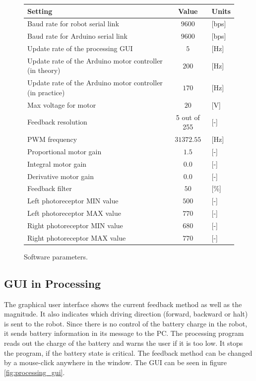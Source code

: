 	\begin{figure}[h!]
		\centering
		\begin{tabular}{|l|c|l|}
			
			\hline
			Setting & Value & Units \\ \hline \hline
			Baud rate for robot serial link & $9600$ & [bps]\\ \hline
			Baud rate for Arduino serial link & $9600$ & [bps] \\ \hline
			Update rate of the processing GUI & $5$ & [Hz] \\ \hline
			Update rate of the Arduino motor controller (in theory) & $200$ & [Hz] \\ \hline
			Update rate of the Arduino motor controller (in practice) & $170$ & [Hz] \\ \hline %
			Max voltage for motor & $20$ & [V] \\ \hline
			Feedback resolution & 5 out of 255 & [-] \\ \hline
			PWM frequency & $31372.55$ & [Hz]  \\ \hline
			Proportional motor gain & $1.5$  & [-] \\ \hline
			Integral motor gain & $0.0$  & [-]\\ \hline
			Derivative motor gain & $0.0$  & [-]\\ \hline
			Feedback filter  & $50$ & [\%] \\ \hline %
			Left photoreceptor MIN value & $500$ & [-] \\ \hline %
			Left photoreceptor MAX value & $770$ & [-] \\ \hline
			Right photoreceptor MIN value & $680$ & [-] \\ \hline
			Right photoreceptor MAX value & $770$ & [-] \\ \hline			
		\end{tabular}
		\caption{Software parameters.}
		\label{tab:programming_params}
	\end{figure}
	
	\subsection{GUI in Processing}
	The graphical user interface shows the current feedback method as well as the magnitude. It also indicates which driving direction (forward, backward or halt) is sent to the robot. Since there is no control of the battery charge in the robot, it sends battery information in its message to the PC. The processing program reads out the charge of the battery and warns the user if it is too low. It stops the program, if the battery state is critical. The feedback method can be changed by a mouse-click anywhere in the window. The GUI can be seen in figure \ref{fig:processing_gui}.
	 
